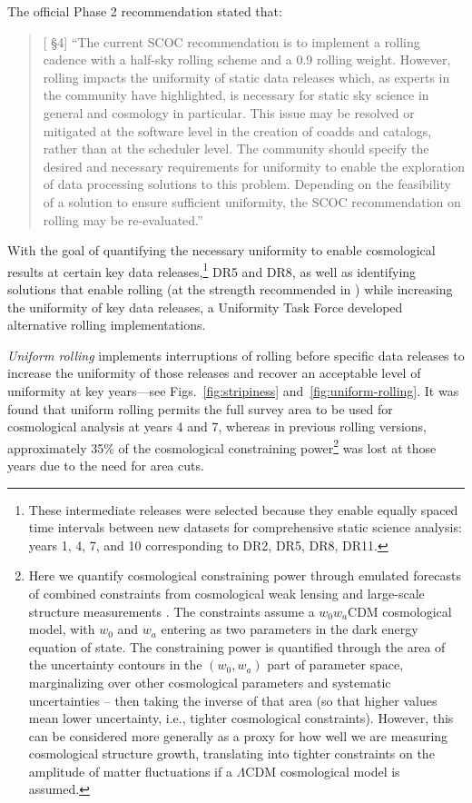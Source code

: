 The official Phase 2 recommendation stated that:
\vspace{-0.5cm}
\begin{quote}
     {[ \S4] 
     ``The current SCOC recommendation is to implement a rolling cadence with a half-sky rolling scheme and a 0.9 rolling weight. However, rolling impacts the uniformity of static data releases which, as experts in the community have highlighted, is necessary for static sky science in general and cosmology in particular. This issue may be resolved or mitigated at the software level in the creation of coadds and catalogs, rather than at the scheduler level. The community should specify the desired and necessary requirements for uniformity to enable the exploration of data processing solutions to this problem. Depending on the feasibility of a solution to ensure sufficient uniformity, the SCOC recommendation on rolling may be re-evaluated.'' }

 \end{quote}

 With the goal of quantifying the necessary uniformity to enable cosmological results at certain key data releases,\footnote{These intermediate releases were selected because they enable equally spaced time intervals between new datasets for comprehensive static science analysis: years 1, 4, 7, and 10 corresponding to DR2, DR5, DR8, DR11.} DR5 and DR8, as well as identifying solutions that enable rolling (at the strength recommended in ) while increasing the uniformity of key data releases, a Uniformity Task Force developed alternative rolling implementations. 
 
 {\it Uniform rolling} implements interruptions of rolling before specific data releases to increase the uniformity of those releases and recover an acceptable level of uniformity at key years---see Figs.~\ref{fig:stripiness} and~\ref{fig:uniform-rolling}.  It was found that uniform rolling permits the full survey area to be used for cosmological analysis at years 4 and 7, whereas in previous rolling versions, approximately 35\% of the cosmological constraining power\footnote{Here we quantify cosmological constraining power through emulated forecasts of combined constraints from cosmological weak lensing and large-scale structure measurements \citep{2022ApJS..259...58L}.  The constraints assume a $w_0 w_a$CDM cosmological model, with $w_0$ and $w_a$ entering as two parameters in the dark energy equation of state.  The constraining power is quantified through the area of the uncertainty contours in the $(w_0, w_a)$ part of parameter space, marginalizing over other cosmological parameters and systematic uncertainties -- then taking the inverse of that area (so that higher values mean lower uncertainty, i.e., tighter cosmological constraints).  However, this can be considered more generally as a proxy for how well we are measuring cosmological structure growth, translating into tighter constraints on the amplitude of matter fluctuations if a $\Lambda$CDM cosmological model is assumed.} was lost at those years due to the need for area cuts. 

